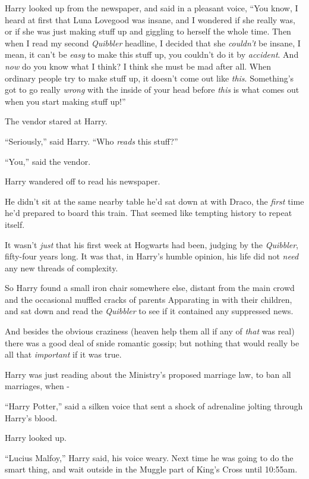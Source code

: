 Harry looked up from the newspaper, and said in a pleasant voice, ``You know, I heard at first that Luna Lovegood was insane, and I wondered if she really was, or if she was just making stuff up and giggling to herself the whole time. Then when I read my second \emph{Quibbler} headline, I decided that she \emph{couldn't} be insane, I mean, it can't be \emph{easy} to make this stuff up, you couldn't do it by \emph{accident}. And \emph{now} do you know what I think? I think she must be mad after all. When ordinary people try to make stuff up, it doesn't come out like \emph{this}. Something's got to go really \emph{wrong} with the inside of your head before \emph{this} is what comes out when you start making stuff up!''

The vendor stared at Harry.

``Seriously,'' said Harry. ``Who \emph{reads} this stuff?''

``You,'' said the vendor.

Harry wandered off to read his newspaper.

He didn't sit at the same nearby table he'd sat down at with Draco, the \emph{first} time he'd prepared to board this train. That seemed like tempting history to repeat itself.

It wasn't \emph{just} that his first week at Hogwarts had been, judging by the \emph{Quibbler}, fifty-four years long. It was that, in Harry's humble opinion, his life did not \emph{need} any new threads of complexity.

So Harry found a small iron chair somewhere else, distant from the main crowd and the occasional muffled cracks of parents Apparating in with their children, and sat down and read the \emph{Quibbler} to see if it contained any suppressed news.

And besides the obvious craziness (heaven help them all if any of \emph{that} was real) there was a good deal of snide romantic gossip; but nothing that would really be all that \emph{important} if it was true.

Harry was just reading about the Ministry's proposed marriage law, to ban all marriages, when -

``Harry Potter,'' said a silken voice that sent a shock of adrenaline jolting through Harry's blood.

Harry looked up.

``Lucius Malfoy,'' Harry said, his voice weary. Next time he was going to do the smart thing, and wait outside in the Muggle part of King's Cross until 10:55am.

